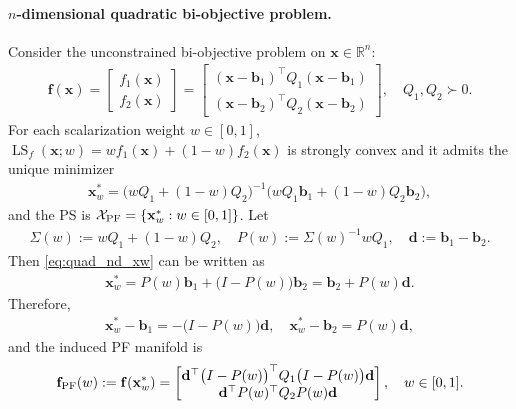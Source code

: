 \documentclass{article}
\newcommand{\bx}{\mathbf{x}}
\newcommand{\bb}{\mathbf{b}}
\newcommand{\bd}{\mathbf{d}}
\newcommand{\XPF}{{\mathcal{X}_{\rm PF}}}
\newcommand{\LS}{\operatorname{LS}}
\newcommand{\f}{\mathbf{f}}
\begin{document}
\paragraph{$n$-dimensional quadratic bi-objective problem.}
Consider the unconstrained bi-objective problem on $\bx\in \mathbb{R}^n$:
\begin{align}
\f(\bx)
=
\begin{bmatrix}
f_1(\bx)\\
f_2(\bx)
\end{bmatrix}
=
\begin{bmatrix}
(\bx-\bb_1)^\top Q_1 (\bx-\bb_1)\\
(\bx-\bb_2)^\top Q_2 (\bx-\bb_2)
\end{bmatrix},
\quad Q_1,Q_2\succ 0.
\end{align}
For each scalarization weight $w\in[0,1]$, $\LS_f(\bx;w)=w f_1(\bx)+(1-w)f_2(\bx)$ is strongly convex and it admits the unique minimizer
\begin{align}
\bx_w^*
=
\bigl(wQ_1+(1-w)Q_2\bigr)^{-1}
\bigl(wQ_1\bb_1+(1-w)Q_2\bb_2\bigr),
\label{eq:quad_nd_xw}
\end{align}
and the PS is $\XPF
=
\{\bx_w^*:w\in[0,1]\}$.
Let
\begin{align}
\Sigma(w):=wQ_1+(1-w)Q_2,
\quad
P(w):=\Sigma(w)^{-1}wQ_1,
\quad
\bd:=\bb_1-\bb_2.
\end{align}
Then \eqref{eq:quad_nd_xw} can be written as
\begin{align}
\bx_w^*
=
P(w)\bb_1+\bigl(I-P(w)\bigr)\bb_2
=
\bb_2+P(w)\bd.
\end{align}
Therefore,
\begin{align}
\bx_w^*-\bb_1
=
-\bigl(I-P(w)\bigr)\bd,
\quad
\bx_w^*-\bb_2
=
P(w)\bd,
\end{align}
and the induced PF manifold is
\begin{align}
\f_{\rm PF}(w)
:=
\f(\bx_w^*)
=
\begin{bmatrix}
\bd^\top \bigl(I-P(w)\bigr)^\top Q_1 \bigl(I-P(w)\bigr)\bd\\
\bd^\top P(w)^\top Q_2 P(w)\bd
\end{bmatrix},
\quad w\in[0,1].
\end{align}
\end{document}
